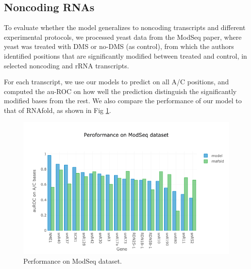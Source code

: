 \documentclass{proposal}
\begin{document}
\subsection{Noncoding RNAs}

To evaluate whether the model generalizes to noncoding transcripts and different experimental protocols,
we processed yeast data from the ModSeq paper\cite{talkish2014mod},
where yeast was treated with DMS or no-DMS (as control),
from which the authors identified positions that are significantly modified between treated and control,
in selected noncoding and rRNA transcripts.

For each transcript, we use our models to predict on all A/C positions,
and computed the au-ROC on how well the prediction distinguish the significantly modified bases from the rest.
We also compare the performance of our model to that of RNAfold, as shown in Fig \ref{fig:yeast_modseq_performance}.

\begin{figure}[h!]
\includegraphics[width=\textwidth]{yeast_modseq_performance.png}
\caption{Performance on ModSeq dataset.}
\label{fig:yeast_modseq_performance}
\centering
\end{figure}


%
%



%
%




\end{document}
